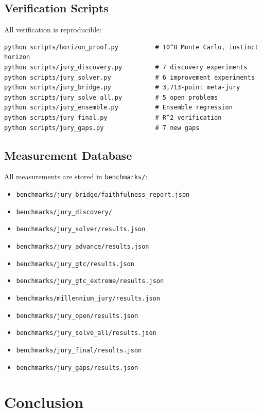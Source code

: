 \documentclass[11pt]{article}
\begin{document}
\subsection{Verification Scripts}

All verification is reproducible:

\begin{verbatim}
python scripts/horizon_proof.py          # 10^8 Monte Carlo, instinct horizon
python scripts/jury_discovery.py         # 7 discovery experiments
python scripts/jury_solver.py            # 6 improvement experiments
python scripts/jury_bridge.py            # 3,713-point meta-jury
python scripts/jury_solve_all.py         # 5 open problems
python scripts/jury_ensemble.py          # Ensemble regression
python scripts/jury_final.py             # R^2 verification
python scripts/jury_gaps.py              # 7 new gaps
\end{verbatim}

\subsection{Measurement Database}

All measurements are stored in \texttt{benchmarks/}:
\begin{itemize}[nosep]
\item \texttt{benchmarks/jury\_bridge/faithfulness\_report.json}
\item \texttt{benchmarks/jury\_discovery/}
\item \texttt{benchmarks/jury\_solver/results.json}
\item \texttt{benchmarks/jury\_advance/results.json}
\item \texttt{benchmarks/jury\_gtc/results.json}
\item \texttt{benchmarks/jury\_gtc\_extreme/results.json}
\item \texttt{benchmarks/millennium\_jury/results.json}
\item \texttt{benchmarks/jury\_open/results.json}
\item \texttt{benchmarks/jury\_solve\_all/results.json}
\item \texttt{benchmarks/jury\_final/results.json}
\item \texttt{benchmarks/jury\_gaps/results.json}
\end{itemize}

\newpage
\section{Conclusion}
\end{document}
